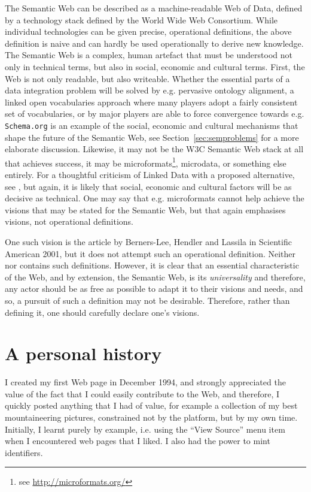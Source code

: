 The Semantic Web can be described as a machine-readable Web of Data,
defined by a technology stack defined by the World Wide Web
Consortium. While individual technologies can be given precise,
operational definitions, the above definition is naive and can hardly
be used operationally to derive new knowledge. The Semantic Web is a
complex, human artefact that must be understood not only in technical
terms, but also in social, economic and cultural terms. First, the Web
is not only readable, but also writeable. Whether the essential parts
of a data integration problem will be solved by e.g. pervasive
ontology alignment, a linked open vocabularies approach where many
players adopt a fairly consistent set of vocabularies, or by major
players are able to force convergence towards e.g. \texttt{Schema.org}
is an example of the social, economic and cultural mechanisms that
shape the future of the Semantic Web, see
Section~\ref{sec:semproblems} for a more elaborate
discussion. Likewise, it may not be the W3C Semantic Web stack at all
that achieves success, it may be microformats\footnote{see
  \url{http://microformats.org/}}, microdata\cite{microdata}, or
something else entirely. For a thoughtful criticism of Linked Data
with a proposed alternative, see \cite{darobin1}, but again, it is
likely that social, economic and cultural factors will be as decisive
as technical. One may say that e.g. microformats cannot help achieve
the visions that may be stated for the Semantic Web, but that again
emphasises visions, not operational definitions.

One such vision is the article by Berners-Lee, Hendler and Lassila in
Scientific American 2001\cite{berners2001semantic}, but it does not attempt such an
operational definition. Neither \cite{semwebroadmap} nor \cite{berners2000weaving} contains
such definitions. However, it is clear that an essential
characteristic of the Web, and by extension, the Semantic Web, is its
\emph{universality} and therefore, any actor should be as free as
possible to adapt it to their visions and needs, and so, a pursuit of
such a definition may not be desirable. Therefore, rather than
defining it, one should carefully declare one's visions.

\section{A personal history}\label{sec:history}

I created my first Web page in December 1994, and strongly appreciated
the value of the fact that I could easily contribute to the Web, and
therefore, I quickly posted anything that I had of value, for example
a collection of my best mountaineering pictures, constrained not by
the platform, but by my own time. Initially, I learnt purely by
example, i.e. using the ``View Source'' menu item when I encountered
web pages that I liked. I also had the power to mint identifiers. 


